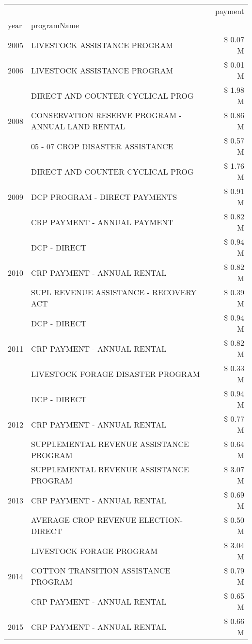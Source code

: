 \begin{tabular}{llr}
\toprule
 &  & payment \\
year & programName &  \\
\midrule
2005 & LIVESTOCK ASSISTANCE PROGRAM & \$ 0.07 M \\
\cline{1-3}
2006 & LIVESTOCK ASSISTANCE PROGRAM & \$ 0.01 M \\
\cline{1-3}
\multirow[t]{3}{*}{2008} & DIRECT AND COUNTER CYCLICAL PROG & \$ 1.98 M \\
 & CONSERVATION RESERVE PROGRAM - ANNUAL LAND RENTAL & \$ 0.86 M \\
 & 05 - 07 CROP DISASTER ASSISTANCE & \$ 0.57 M \\
\cline{1-3}
\multirow[t]{3}{*}{2009} & DIRECT AND COUNTER CYCLICAL PROG & \$ 1.76 M \\
 & DCP PROGRAM - DIRECT PAYMENTS & \$ 0.91 M \\
 & CRP PAYMENT - ANNUAL PAYMENT & \$ 0.82 M \\
\cline{1-3}
\multirow[t]{3}{*}{2010} & DCP - DIRECT & \$ 0.94 M \\
 & CRP PAYMENT - ANNUAL RENTAL & \$ 0.82 M \\
 & SUPL REVENUE ASSISTANCE - RECOVERY ACT & \$ 0.39 M \\
\cline{1-3}
\multirow[t]{3}{*}{2011} & DCP - DIRECT & \$ 0.94 M \\
 & CRP PAYMENT - ANNUAL RENTAL & \$ 0.82 M \\
 & LIVESTOCK FORAGE DISASTER PROGRAM & \$ 0.33 M \\
\cline{1-3}
\multirow[t]{3}{*}{2012} & DCP - DIRECT & \$ 0.94 M \\
 & CRP PAYMENT - ANNUAL RENTAL & \$ 0.77 M \\
 & SUPPLEMENTAL REVENUE ASSISTANCE PROGRAM & \$ 0.64 M \\
\cline{1-3}
\multirow[t]{3}{*}{2013} & SUPPLEMENTAL REVENUE ASSISTANCE PROGRAM & \$ 3.07 M \\
 & CRP PAYMENT - ANNUAL RENTAL & \$ 0.69 M \\
 & AVERAGE CROP REVENUE ELECTION-DIRECT & \$ 0.50 M \\
\cline{1-3}
\multirow[t]{3}{*}{2014} & LIVESTOCK FORAGE PROGRAM & \$ 3.04 M \\
 & COTTON TRANSITION ASSISTANCE PROGRAM & \$ 0.79 M \\
 & CRP PAYMENT - ANNUAL RENTAL & \$ 0.65 M \\
\cline{1-3}
\multirow[t]{3}{*}{2015} & CRP PAYMENT - ANNUAL RENTAL & \$ 0.66 M \\

\end{tabular}
